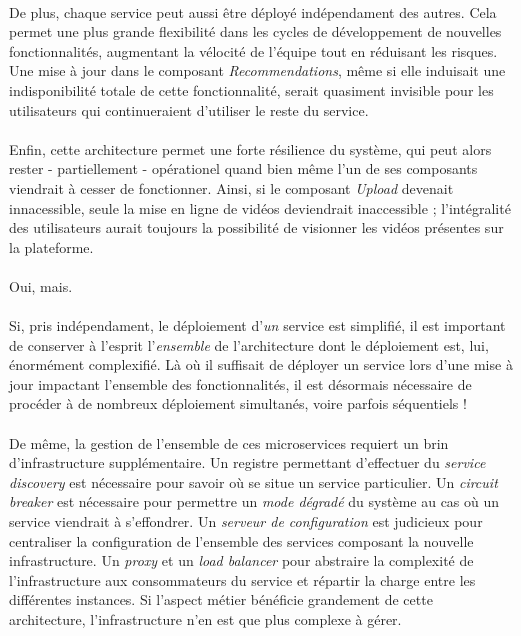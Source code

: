 \paragraph{} De plus, chaque service peut aussi être déployé indépendament des autres. Cela permet une plus grande flexibilité dans
les cycles de développement de nouvelles fonctionnalités, augmentant la vélocité de l'équipe tout en réduisant les risques.
Une mise à jour dans le composant \emph{Recommendations}, même si elle induisait une indisponibilité totale de cette fonctionnalité,
serait quasiment invisible pour les utilisateurs qui continueraient d'utiliser le reste du service.

\paragraph{} Enfin, cette architecture permet une forte résilience du système, qui peut alors rester - partiellement - 
opérationel quand bien même l'un de ses composants viendrait à cesser de fonctionner. Ainsi, si le composant \emph{Upload}
devenait innacessible, seule la mise en ligne de vidéos deviendrait inaccessible ; l'intégralité des utilisateurs aurait
toujours la possibilité de visionner les vidéos présentes sur la plateforme.

\paragraph{} Oui, mais.

\paragraph{} Si, pris indépendament, le déploiement d'\emph{un} service est simplifié, il est important de conserver
à l'esprit l'\emph{ensemble} de l'architecture dont le déploiement est, lui, énormément complexifié. Là où il suffisait de 
déployer un service lors d'une mise à jour impactant l'ensemble des fonctionnalités, il est désormais nécessaire de procéder 
à de nombreux déploiement simultanés, voire parfois séquentiels !

\paragraph{} De même, la gestion de l'ensemble de ces microservices requiert un brin d'infrastructure supplémentaire.
Un registre permettant d'effectuer du \emph{service discovery} est nécessaire pour savoir où se situe un service particulier.
Un \emph{circuit breaker} est nécessaire pour permettre un \emph{mode dégradé} du système au cas où un service viendrait
à s'effondrer. Un \emph{serveur de configuration} est judicieux pour centraliser la configuration de l'ensemble des services
composant la nouvelle infrastructure. Un \emph{proxy} et un \emph{load balancer} pour abstraire la complexité de l'infrastructure
aux consommateurs du service et répartir la charge entre les différentes instances. Si l'aspect métier bénéficie grandement
de cette architecture, l'infrastructure n'en est que plus complexe à gérer.

